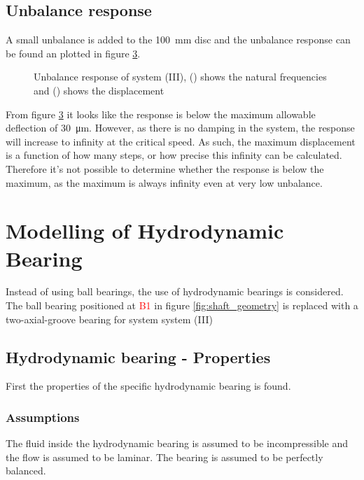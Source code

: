 \subsection{Unbalance response \label{sec:unbalance_response_ball_bearing}}
A small unbalance is added to the \SI{100}{\milli \meter} disc and the unbalance response can be found an plotted in figure \ref{fig:unbalance_response}.
\begin{figure}[ht]
\begin{subfigure}[t]{0.49\textwidth}
    \centering
    
    \caption{}
    \label{fig:unbalance_response_natural}
\end{subfigure}
\hfill
\begin{subfigure}[t]{0.49\textwidth}
    \centering
    
    \caption{}
    \label{fig:unbalance_response_disp}
\end{subfigure}
\caption{Unbalance response of system (III), () shows the natural frequencies and () shows the displacement}
\label{fig:unbalance_response}
\end{figure}
From figure \ref{fig:unbalance_response} it looks like the response is below the maximum allowable deflection of \SI{30}{\micro \meter}. However, as there is no damping in the system, the response will increase to infinity at the critical speed. As such, the maximum displacement is a function of how many steps, or how precise this infinity can be calculated.
Therefore it's not possible to determine whether the response is below the maximum, as the maximum is always infinity even at very low unbalance.

\section{Modelling of Hydrodynamic Bearing}
Instead of using ball bearings, the use of hydrodynamic bearings is considered. The ball bearing positioned at \textcolor{red}{B1} in figure \ref{fig:shaft_geometry} is replaced with a two-axial-groove bearing for system  system (III)

\subsection{Hydrodynamic bearing - Properties}
First the properties of the specific hydrodynamic bearing is found.

\subsubsection{Assumptions}
The fluid inside the hydrodynamic bearing is assumed to be incompressible and the flow is assumed to be laminar. The bearing is assumed to be perfectly balanced.

